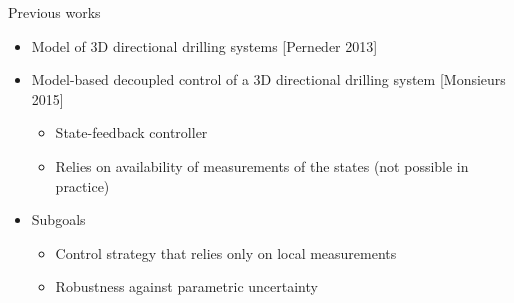 \documentclass{beamer}
\begin{document}
\begin{frame}{Previous works}
	\begin{itemize}\setlength\itemsep{1em}
		\item Model of 3D directional drilling systems [Perneder 2013]
		\item Model-based decoupled control of a 3D directional drilling system [Monsieurs 2015]
		\begin{itemize}\setlength\itemsep{1em}
			\item State-feedback controller
			\item Relies on availability of measurements of the states (not possible in practice)
		\end{itemize}
	\item []\begin{block}{Subgoals}	
	\begin{itemize}\setlength\itemsep{1em}
		\item Control strategy that relies only on local measurements
		\item Robustness against parametric uncertainty
	\end{itemize}
	\end{block}
	\end{itemize}
\end{frame}
\end{document}
